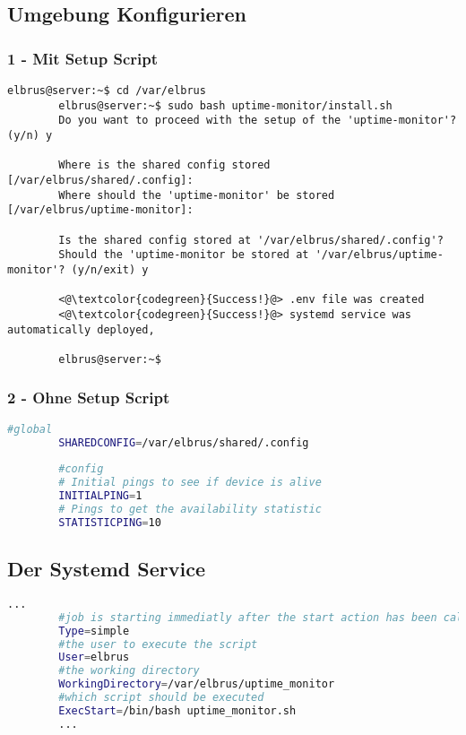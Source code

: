 	\subsection[file config]{Umgebung Konfigurieren}
	\subsubsection{1 - Mit Setup Script}
	
	\lstset{style=commands}
	\begin{lstlisting}[caption={Ausführen des 'install.sh' Scripts.}]
		elbrus@server:~$ cd /var/elbrus
		elbrus@server:~$ sudo bash uptime-monitor/install.sh
		Do you want to proceed with the setup of the 'uptime-monitor'? (y/n) y
		
		Where is the shared config stored [/var/elbrus/shared/.config]:
		Where should the 'uptime-monitor' be stored [/var/elbrus/uptime-monitor]:
		
		Is the shared config stored at '/var/elbrus/shared/.config'?
		Should the 'uptime-monitor be stored at '/var/elbrus/uptime-monitor'? (y/n/exit) y
		
		<@\textcolor{codegreen}{Success!}@> .env file was created
		<@\textcolor{codegreen}{Success!}@> systemd service was automatically deployed,
		
		elbrus@server:~$
	\end{lstlisting}
	
	\subsubsection{2 - Ohne Setup Script}
	
	\lstset{style=files}
	\begin{lstlisting}[caption={Anhand von '.env.example' eigene '.env' Datei anlegen.}, language=bash]
		#global
		SHAREDCONFIG=/var/elbrus/shared/.config
		
		#config
		# Initial pings to see if device is alive
		INITIALPING=1
		# Pings to get the availability statistic
		STATISTICPING=10
	\end{lstlisting}
	\newpage
	
	\subsection[systemd service]{Der Systemd Service}
	
	\lstset{style=files}
	\begin{lstlisting}[caption={uptime\_monitor.service.example - Die Variable 'WorkingDirectory' sowie die Variable 'User' anpassen.},language=bash ,keywords={WorkingDirectory, User}, keywordstyle=\color{red}, firstnumber=5]
		...
		#job is starting immediatly after the start action has been called
		Type=simple
		#the user to execute the script
		User=elbrus
		#the working directory
		WorkingDirectory=/var/elbrus/uptime_monitor
		#which script should be executed
		ExecStart=/bin/bash uptime_monitor.sh
		...
	\end{lstlisting}
	
